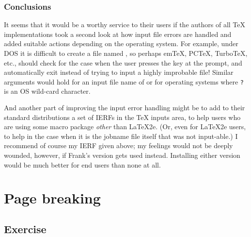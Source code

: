 \subsection{Conclusions}

It seems that it would be a worthy service to their users if the authors
of all TeX implementations took a second look at how input file errors
are handled and added suitable actions depending on the operating
system. For example, under DOS it is difficult to create a file named
, so perhaps emTeX, PCTeX, TurboTeX, etc., should check for the case
when the user presses the  key at the prompt, and automatically
exit instead of trying to input a highly improbable file! Similar
arguments would hold for an input file name of  or  
for operating
systems where \texttt{?} is an OS wild-card character.

And another part of improving the input error handling might be to add
to their standard distributions a set of IERFs in the TeX inputs area,
to help users who are using some macro package \emph{other} than LaTeX2e.
(Or, even for LaTeX2e users, to help in the case when it is the jobname
file itself that was not input-able.) I recommend of course my IERF
given above; my feelings would not be deeply wounded, however, if
Frank's version gets used instead. Installing either version would be
much better for end users than none at all.

\begin{comment}
Michael Downes %
mjd@math.ams.org (Internet) ASCII 32--54,55--126: !"#$%
789:;<=>?@ABCDEFGHIJKLMNOPQRSTUVWXYZ[\]^_`abcdefghijklmnopqrstuvwxyz{|}~
\end{comment}


\chapter{Page breaking}

\section{Exercise}

\begin{comment}
Date: 21 Apr 1994 09:48:48 -0400 (EDT)
From: Michael Downes <MJD@MATH.AMS.ORG>
Subject: Around the Bend #18
To: info-tex@shsu.edu
X-ListName: TeX-Related Network Discussion List <INFO-TeX@SHSU.edu>

========================================================================
*** Exercise 18:
\end{comment}

